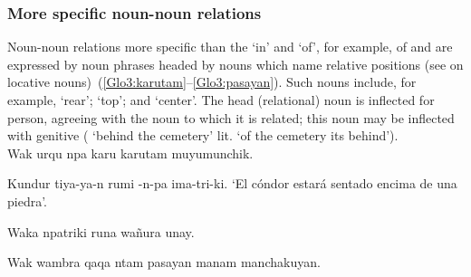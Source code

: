 \subsubsection{More specific noun-noun relations}\label{sssec:msnnr}
Noun-noun relations more specific than the ‘in’ and ‘of’, for example, of  and  are expressed by noun phrases headed by nouns which name relative positions (see  on locative nouns)~(\ref{Glo3:karutam}--\ref{Glo3:pasayan}). Such nouns include, for example,  ‘rear’;  ‘top’; and  ‘center’. The head (relational) noun is inflected for person, agreeing with the noun to which it is related; this noun may be inflected with genitive  ( ‘behind the cemetery’ lit. ‘of the cemetery its behind’).\\

%
{Wak urqu npa karu karutam muyumunchik.}%
{}%
{}{}%


%
{Kundur tiya-ya-n rumi -n-pa ima-tri-ki.}%
{}%
{‘El cóndor estará sentado encima de una piedra’.}%
{}{}%
 

%
{Waka npatriki runa wañura unay.}%
{}%
{}{}%

%
{Wak wambra qaqa ntam pasayan manam manchakuyan.}%
{}%
{}{}%

